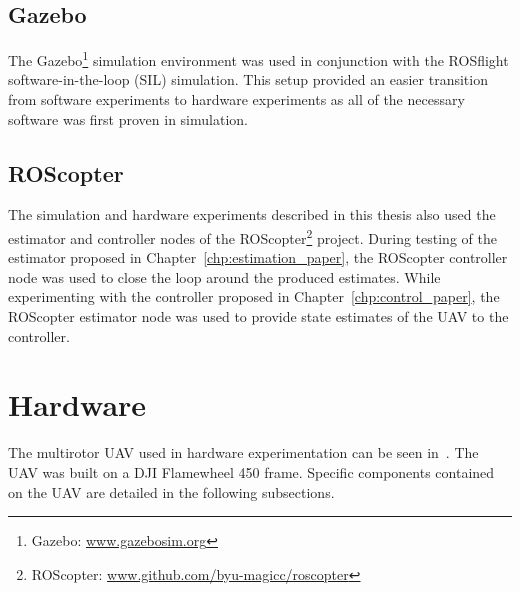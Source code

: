 \subsection {Gazebo}
The Gazebo\footnote{Gazebo:
\url{www.gazebosim.org}}
simulation environment was used
in conjunction
with the ROSflight software-in-the-loop
(SIL) simulation.
This setup provided an easier transition from software
experiments to
hardware experiments as all of the necessary software was first proven in
simulation.


\subsection {ROScopter}
The simulation and hardware experiments described in this thesis also used
the estimator and controller nodes of the ROScopter\footnote{ROScopter:
\url{www.github.com/byu-magicc/roscopter}}
project.
During testing of the estimator proposed in
Chapter~\ref{chp:estimation_paper}, the ROScopter controller node was used to
close the loop around the produced estimates.
While experimenting with the
controller proposed in Chapter~\ref{chp:control_paper}, the ROScopter estimator node
was used to provide state estimates of the UAV to the controller.

\section{Hardware}
The multirotor UAV used in hardware experimentation can be seen
in~. The UAV was built on a DJI Flamewheel 450 frame.
Specific components contained on the UAV are detailed in the following
subsections.

